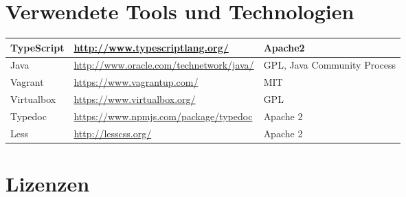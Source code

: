 \begin{landscape}
	\section{Verwendete Tools und Technologien}
	
		\begin{tabularx}{\linewidth}{| l | l | X |}
			\hline
			TypeScript & \url{http://www.typescriptlang.org/} & Apache2 \\
			\hline
			Java & \url{http://www.oracle.com/technetwork/java/} & GPL, Java Community Process\\
			\hline
			Vagrant & \url{https://www.vagrantup.com/} & MIT \\
			\hline
			Virtualbox & \url{https://www.virtualbox.org/} &  GPL \\
			\hline
			Typedoc & \url{https://www.npmjs.com/package/typedoc} &  Apache 2 \\
			\hline
			Less & \url{http://lesscss.org/} &  Apache 2 \\
			\hline
		\end{tabularx}
		
			
	\section{Lizenzen}
	\label{sec:licenses}
	
	\newcommand{\addLicense}[6]{
		#1 & #2 & \url{#3} & #4 & #5 & #6	\\
		\hline
	}


\end{landscape}
